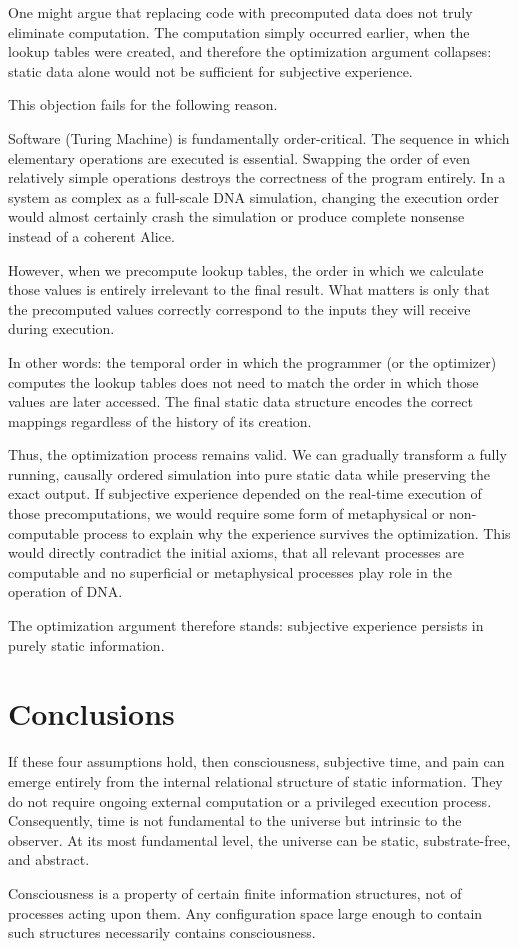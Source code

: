 One might argue that replacing code with precomputed data does not truly eliminate computation.
The computation simply occurred earlier, when the lookup tables were created, and therefore the optimization argument collapses:
static data alone would not be sufficient for subjective experience.

This objection fails for the following reason.

Software (Turing Machine) is fundamentally order-critical. The sequence in which elementary operations are executed is essential.
Swapping the order of even relatively simple operations destroys the correctness of the program entirely.
In a system as complex as a full-scale DNA simulation, changing the execution order would almost certainly crash the simulation or produce
complete nonsense instead of a coherent Alice.

However, when we precompute lookup tables, the order in which we calculate those values is entirely irrelevant to the final result.
What matters is only that the precomputed values correctly correspond to the inputs they will receive during execution. 

In other words: the temporal order in which the programmer (or the optimizer) computes the lookup tables does not need to match the order in which those values are later accessed.
The final static data structure encodes the correct mappings regardless of the history of its creation.

Thus, the optimization process remains valid. We can gradually transform a fully running, causally ordered simulation into pure static data while preserving the exact output.
If subjective experience depended on the real-time execution of those precomputations, we would require some form of metaphysical or
non-computable process to explain why the experience survives the optimization.
This would directly contradict the initial axioms, that all relevant processes are computable and no superficial or metaphysical processes play role in the operation of DNA.

The optimization argument therefore stands: subjective experience persists in purely static information.



\section{Conclusions}

If these four assumptions hold, then consciousness, subjective time, and pain can emerge entirely from the internal relational structure of static information.
They do not require ongoing external computation or a privileged execution process.
Consequently, time is not fundamental to the universe but intrinsic to the observer.
At its most fundamental level, the universe can be static, substrate-free, and abstract.

Consciousness is a property of certain finite information structures, not of processes acting upon them.
Any configuration space large enough to contain such structures necessarily contains consciousness.
